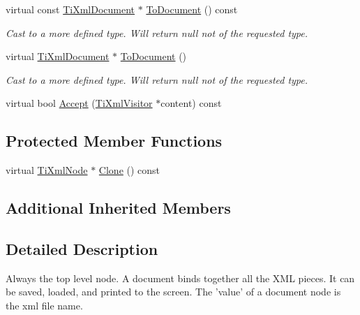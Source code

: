 \begin{DoxyCompactItemize}
\item 
\hypertarget{classTiXmlDocument_a1dc977bde3e4fe85a8eb9d88a35ef5a4}{virtual const \hyperlink{classTiXmlDocument}{Ti\-Xml\-Document} $\ast$ \hyperlink{classTiXmlDocument_a1dc977bde3e4fe85a8eb9d88a35ef5a4}{To\-Document} () const }\label{classTiXmlDocument_a1dc977bde3e4fe85a8eb9d88a35ef5a4}

\begin{DoxyCompactList}\small\item\em Cast to a more defined type. Will return null not of the requested type. \end{DoxyCompactList}\item 
\hypertarget{classTiXmlDocument_a1025d942a1f328fd742d545e37efdd42}{virtual \hyperlink{classTiXmlDocument}{Ti\-Xml\-Document} $\ast$ \hyperlink{classTiXmlDocument_a1025d942a1f328fd742d545e37efdd42}{To\-Document} ()}\label{classTiXmlDocument_a1025d942a1f328fd742d545e37efdd42}

\begin{DoxyCompactList}\small\item\em Cast to a more defined type. Will return null not of the requested type. \end{DoxyCompactList}\item 
virtual bool \hyperlink{classTiXmlDocument_a3daab2f472418ef66315750202f762ae}{Accept} (\hyperlink{classTiXmlVisitor}{Ti\-Xml\-Visitor} $\ast$content) const 
\end{DoxyCompactItemize}
\subsection*{Protected Member Functions}
\begin{DoxyCompactItemize}
\item 
virtual \hyperlink{classTiXmlNode}{Ti\-Xml\-Node} $\ast$ \hyperlink{classTiXmlDocument_ac9e8f09b23454d953b32d1b65cd1409e}{Clone} () const 
\end{DoxyCompactItemize}
\subsection*{Additional Inherited Members}


\subsection{Detailed Description}
Always the top level node. A document binds together all the X\-M\-L pieces. It can be saved, loaded, and printed to the screen. The 'value' of a document node is the xml file name. 

